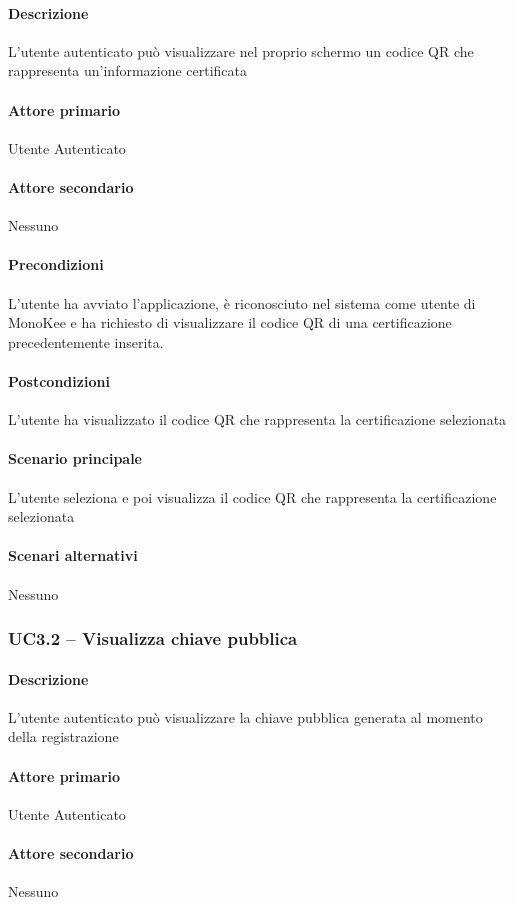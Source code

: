 \paragraph{Descrizione}  L’utente autenticato può visualizzare nel proprio schermo un codice QR che rappresenta un’informazione certificata
\paragraph{Attore primario}  Utente Autenticato
\paragraph{Attore secondario}  Nessuno
\paragraph{Precondizioni}  L’utente ha avviato l’applicazione, è riconosciuto nel sistema come utente di MonoKee e ha richiesto di visualizzare il codice QR di una certificazione precedentemente inserita.
\paragraph{Postcondizioni}  L’utente ha visualizzato il codice QR che rappresenta la certificazione selezionata
\paragraph{Scenario principale}  
L’utente seleziona e poi visualizza il codice QR che rappresenta la certificazione selezionata
\paragraph{Scenari alternativi}  Nessuno


\subsubsection{UC3.2 – Visualizza chiave pubblica}
\paragraph{Descrizione}  L’utente autenticato può visualizzare la chiave pubblica generata al momento della registrazione
\paragraph{Attore primario}  Utente Autenticato
\paragraph{Attore secondario}  Nessuno
